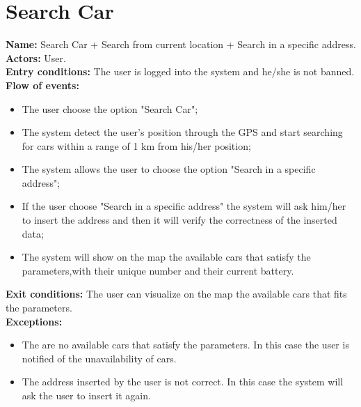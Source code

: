 \section*{Search Car}
\textbf{Name:} Search Car + Search from current location + Search in a specific address.\\
\textbf{Actors:} User.\\
\textbf{Entry conditions:} The user is logged into the system and he/she is not banned.\\
\textbf{Flow of events:}
\begin{itemize}
\item The user choose the option "Search Car";
\item The system detect the user's position through the GPS and start searching for cars within a range of 1 km from his/her position;
\item The system allows the user to choose the option "Search in a specific address";
\item If the user choose "Search in a specific address" the system will ask him/her to insert the address and then it will verify the correctness of the inserted data;
\item The system will show on the map the available cars that satisfy the parameters,with their unique number and their current battery.
\end{itemize}
\textbf{Exit conditions:} The user can visualize on the map the available cars that fits the parameters.\\
\textbf{Exceptions:}  
\begin{itemize}
\item The are no available cars that satisfy the parameters. In this case the user is notified of the unavailability of cars.
\item The address inserted by the user is not correct. In this case the system will ask the user to insert it again.
\end{itemize}

